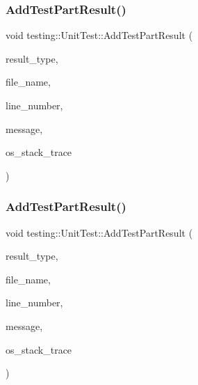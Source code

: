 \mbox{\label{classtesting_1_1_unit_test_a1d157d2e9a5c1d3405333410c6b13932}} 
\subsubsection{\texorpdfstring{AddTestPartResult()}{AddTestPartResult()}\hspace{0.1cm}{\footnotesize\ttfamily [1/3]}}
{\footnotesize\ttfamily void testing\+::\+Unit\+Test\+::\+Add\+Test\+Part\+Result (\begin{DoxyParamCaption}\item[{Test\+Part\+Result\+::\+Type}]{result\+\_\+type,  }\item[{const char $\ast$}]{file\+\_\+name,  }\item[{int}]{line\+\_\+number,  }\item[{const std\+::string \&}]{message,  }\item[{const std\+::string \&}]{os\+\_\+stack\+\_\+trace }\end{DoxyParamCaption})\hspace{0.3cm}{\ttfamily [private]}}

\mbox{\label{classtesting_1_1_unit_test_a1d157d2e9a5c1d3405333410c6b13932}} 
\subsubsection{\texorpdfstring{AddTestPartResult()}{AddTestPartResult()}\hspace{0.1cm}{\footnotesize\ttfamily [2/3]}}
{\footnotesize\ttfamily void testing\+::\+Unit\+Test\+::\+Add\+Test\+Part\+Result (\begin{DoxyParamCaption}\item[{Test\+Part\+Result\+::\+Type}]{result\+\_\+type,  }\item[{const char $\ast$}]{file\+\_\+name,  }\item[{int}]{line\+\_\+number,  }\item[{const std\+::string \&}]{message,  }\item[{const std\+::string \&}]{os\+\_\+stack\+\_\+trace }\end{DoxyParamCaption})\hspace{0.3cm}{\ttfamily [private]}}

